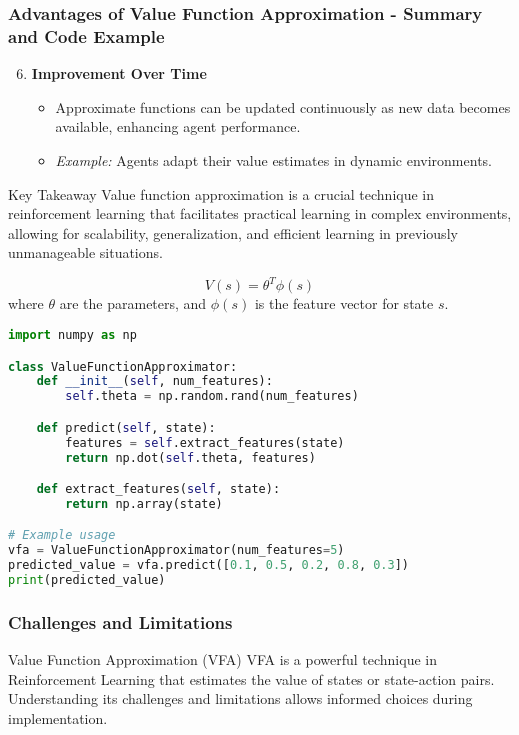 \documentclass[aspectratio=169]{beamer}
\begin{document}
\begin{frame}[fragile]
    \frametitle{Advantages of Value Function Approximation - Summary and Code Example}
    \begin{enumerate}
        \setcounter{enumi}{5} %
        \item \textbf{Improvement Over Time}
        \begin{itemize}
            \item Approximate functions can be updated continuously as new data becomes available, enhancing agent performance.
            \item \textit{Example:} Agents adapt their value estimates in dynamic environments.
        \end{itemize}
    \end{enumerate}

    \begin{block}{Key Takeaway}
        Value function approximation is a crucial technique in reinforcement learning that facilitates practical learning in complex environments, allowing for scalability, generalization, and efficient learning in previously unmanageable situations.
    \end{block}

    \begin{equation}
        V(s) = \theta^T \phi(s) 
    \end{equation}
    where $\theta$ are the parameters, and $\phi(s)$ is the feature vector for state $s$.

    \begin{lstlisting}[language=Python]
import numpy as np

class ValueFunctionApproximator:
    def __init__(self, num_features):
        self.theta = np.random.rand(num_features)

    def predict(self, state):
        features = self.extract_features(state)
        return np.dot(self.theta, features)

    def extract_features(self, state):
        return np.array(state)

# Example usage
vfa = ValueFunctionApproximator(num_features=5)
predicted_value = vfa.predict([0.1, 0.5, 0.2, 0.8, 0.3])
print(predicted_value)
    \end{lstlisting}
\end{frame}

\begin{frame}[fragile]
  \frametitle{Challenges and Limitations}
  \begin{block}{Value Function Approximation (VFA)}
    VFA is a powerful technique in Reinforcement Learning that estimates the value of states or state-action pairs. 
    Understanding its challenges and limitations allows informed choices during implementation.
  \end{block}
\end{frame}
\end{document}
